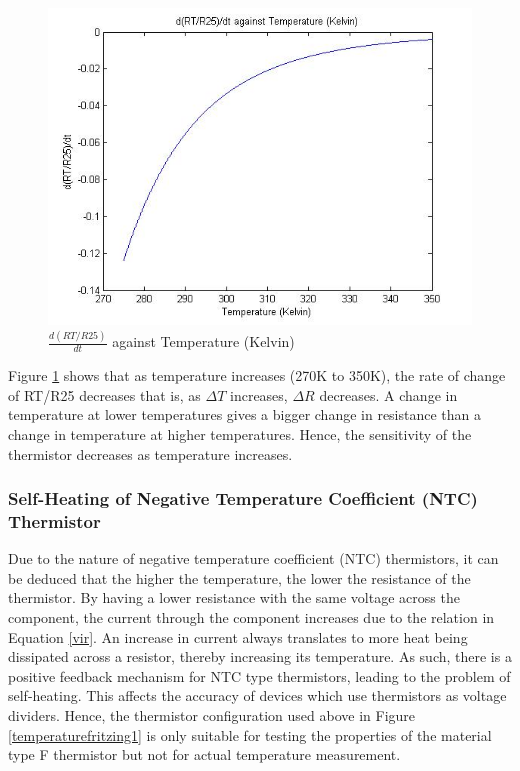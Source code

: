 \begin{figure}[H]
	\centering
	\includegraphics[width=0.8\linewidth]{thermistor5.jpg}
	\caption{$\frac{d(RT/R25)}{dt}$ against Temperature (Kelvin)}
	\label{dRTR25dttemperature}
\end{figure}

Figure \ref{dRTR25dttemperature} shows that as temperature increases (270K to 350K), the rate of change of RT/R25 decreases that is, as $\Delta T$ increases, $\Delta R$ decreases.  A change in temperature at lower temperatures gives a bigger change in resistance than a change in temperature at higher temperatures. Hence, the sensitivity of the thermistor decreases as temperature increases. 

\subsubsection{Self-Heating of Negative Temperature Coefficient (NTC) Thermistor}
Due to the nature of negative temperature coefficient (NTC) thermistors, it can be deduced that the higher the temperature, the lower the resistance of the thermistor. By having a lower resistance with the same voltage across the component, the current through the component increases due to the relation in Equation \ref{vir}. An increase in current always translates to more heat being dissipated across a resistor, thereby increasing its temperature. As such, there is a positive feedback mechanism for NTC type thermistors, leading to the problem of self-heating. This affects the accuracy of devices which use thermistors as voltage dividers. Hence, the thermistor configuration used above in Figure \ref{temperaturefritzing1} is only suitable for testing the properties of the material type F thermistor but not for actual temperature measurement.  

